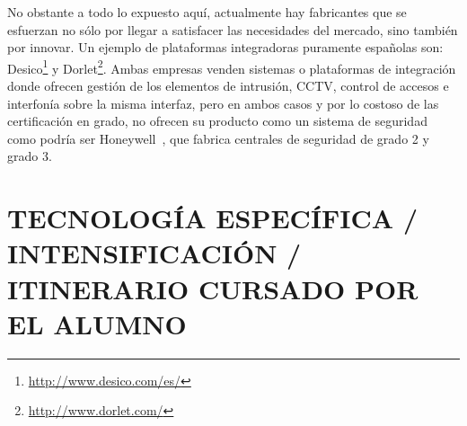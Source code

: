 \documentclass{pre-tfg}
\begin{document}
No obstante a todo lo expuesto aquí, actualmente hay fabricantes que se esfuerzan no sólo por llegar a satisfacer las necesidades del mercado, sino también por innovar. Un ejemplo de plataformas integradoras puramente españolas son: Desico\footnote{\url{http://www.desico.com/es/}} y Dorlet\footnote{\url{http://www.dorlet.com/}}. Ambas empresas venden sistemas o plataformas de integración donde ofrecen gestión de los elementos de intrusión, CCTV, control de accesos e interfonía sobre la misma interfaz, pero en ambos casos y por lo costoso de las certificación en grado, no ofrecen su producto como un sistema de seguridad como podría ser Honeywell~\cite{Honeywell}, que fabrica centrales de seguridad de grado 2 y grado 3.






\section{TECNOLOGÍA ESPECÍFICA / INTENSIFICACIÓN / ITINERARIO CURSADO POR EL ALUMNO}

\end{document}
